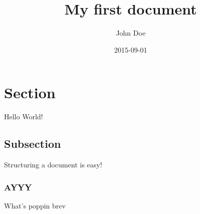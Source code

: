 \documentclass{article}
\title{My first document}
\date{2015-09-01}
\author{John Doe}
\begin{document}
  \maketitle
  
  \maketitle
  
  \section{Section}
  
  Hello World!
  
  \subsection{Subsection}
  
  Structuring a document is easy!
  
  \subsubsection{AYYY}
  What's poppin brev
\end{document}
